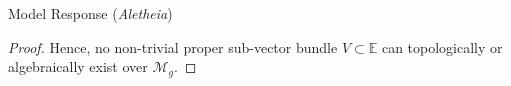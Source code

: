 \documentclass{article}
\theoremstyle{plain}
\theoremstyle{definition}
\newcommand{\Aletheia}{\emph{Aletheia}}
\begin{document}
\begin{solution}{Model Response (\Aletheia)}
\begin{proof}
Hence, no non-trivial proper sub-vector bundle $V \subset \mathbb{E}$ can topologically or algebraically exist over $\mathcal{M}_g$.
\end{proof}
\end{solution}
\end{document}
